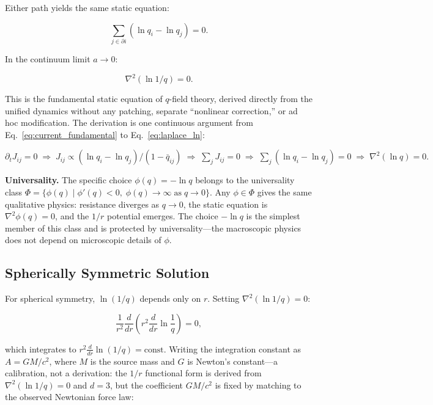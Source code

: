 \documentclass[aps,prd,twocolumn,showpacs,superscriptaddress,preprintnumbers]{revtex4-2}
\begin{document}
Either path yields the same static equation:

\begin{equation}
\sum_{j \in \partial i} (\ln q_i - \ln q_j) = 0.
\label{eq:laplace_ln_disc}
\end{equation}

In the continuum limit $a\to0$:

\begin{equation}
\boxed{\nabla^2(\ln 1/q) = 0}.
\label{eq:laplace_ln}
\end{equation}

This is the fundamental static equation of $q$-field theory, derived directly from the unified dynamics without any patching, separate ``nonlinear correction,'' or ad hoc modification.
The derivation is one continuous argument from Eq.~\eqref{eq:current_fundamental} to Eq.~\eqref{eq:laplace_ln}:

\begin{center}
\small
$\partial_t J_{ij}=0 \;\Rightarrow\; J_{ij} \propto (\ln q_i-\ln q_j)/(1-\bar{q}_{ij}) \;\Rightarrow\; \sum_j J_{ij}=0 \;\Rightarrow\; \sum_j(\ln q_i-\ln q_j)=0 \;\Rightarrow\; \nabla^2(\ln q)=0.$
\end{center}

\textbf{Universality.}
The specific choice $\phi(q)=-\ln q$ belongs to the universality class $\Phi=\{\phi(q) \mid \phi'(q)<0,\;\phi(q)\to\infty\;\text{as}\;q\to0\}$.
Any $\phi\in\Phi$ gives the same qualitative physics: resistance diverges as $q\to0$, the static equation is $\nabla^2\phi(q)=0$, and the $1/r$ potential emerges.
The choice $-\ln q$ is the simplest member of this class and is protected by universality---the macroscopic physics does not depend on microscopic details of $\phi$.

\subsection{Spherically Symmetric Solution}

For spherical symmetry, $\ln(1/q)$ depends only on $r$.
Setting $\nabla^2(\ln 1/q)=0$:

\begin{equation}
\frac{1}{r^2}\frac{d}{dr}\left(r^2 \frac{d}{dr}\ln\frac{1}{q}\right) = 0,
\label{eq:ode}
\end{equation}

which integrates to $r^2\frac{d}{dr}\ln(1/q)=\text{const}$.
Writing the integration constant as $A = GM/c^2$, where $M$ is the source mass and $G$ is Newton's constant---a calibration, not a derivation: the $1/r$ functional form is derived from $\nabla^2(\ln 1/q)=0$ and $d=3$, but the coefficient $GM/c^2$ is fixed by matching to the observed Newtonian force law:
\end{document}
